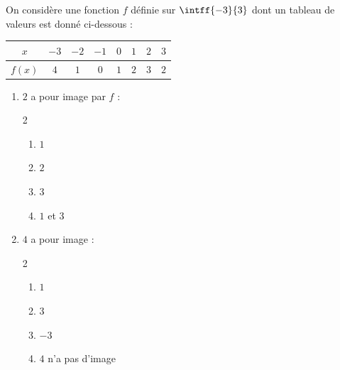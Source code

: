 \begin{exo}{}
	On considère une fonction $f$ définie sur $\intff{-3}{3}$ dont un tableau de valeurs est donné ci-dessous :


	\begin{center}
		\renewcommand{\arraystretch}{1.5}\small
		\begin{tabular}{|c|c|c|c|c|c|c|c|}
			\hline
			\cellcolor{gray!30}$x$    & $-3$ & $-2$ & $-1$ & $0$ & $1$ & $2$ & $3$ \\ \hline
			\cellcolor{gray!30}$f(x)$ & $4$  & $1$  & $0$  & $1$ & $2$ & $3$ & $2$ \\ \hline
		\end{tabular}
	\end{center}

	\begin{enumerate}
		\item $2$ a pour image par $f$ :
		      \vspace*{-2mm}\begin{multicols}{2}
		      \begin{enumerate}
			      \item $1$
			      \item $2$
			      \item $3$
			      \item $1$ et $3$
		      \end{enumerate}
		      \end{multicols}\vspace{-3mm}
		\item $4$ a pour image :
		      \vspace*{-2mm}\begin{multicols}{2}
		      \begin{enumerate}
			      \item $1$
			      \item $3$
			      \item $-3$
			      \item $4$ n'a pas d'image
		      \end{enumerate}
		      \end{multicols}\vspace{-3mm}
	\end{enumerate}
\end{exo}
